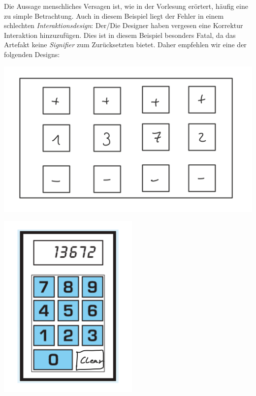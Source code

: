 \graphicspath{ {../images/} } 

Die Aussage menschliches Versagen ist, wie in der Vorlesung erörtert, häufig
eine zu simple Betrachtung. Auch in diesem Beispiel liegt der Fehler in einem
schlechten \textit{Interaktionsdesign}: Der/Die Designer haben vergesen eine
Korrektur Interaktion hinzuzufügen. Dies ist in diesem Beispiel besonders Fatal,
da das Artefakt keine \textit{Signifier} zum Zurücksetzten bietet. Daher
empfehlen wir eine der folgenden Designs:

\begin{minipage}{\linewidth}
  \centering
  \includegraphics{design1}
\end{minipage}

\begin{minipage}{\linewidth}
  \centering
  \includegraphics{design2}
\end{minipage}
